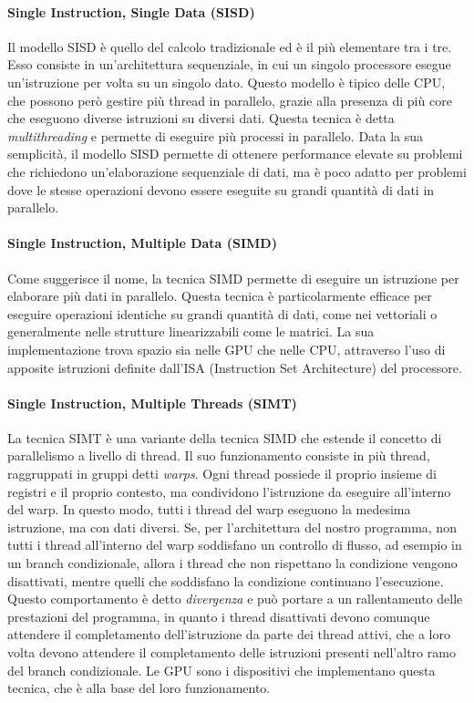 \paragraph{Single Instruction, Single Data (SISD)}
\label{para:simd}

Il modello SISD è quello del calcolo tradizionale ed è il più elementare tra i tre.
Esso consiste in un'architettura sequenziale, in cui un singolo processore esegue
un'istruzione per volta su un singolo dato. Questo modello è tipico delle CPU, che
possono però gestire più thread in parallelo, grazie alla presenza di più core
che eseguono diverse istruzioni su diversi dati. Questa tecnica è detta \textit{multithreading}
e permette di eseguire più processi in parallelo. Data la sua semplicità, il
modello SISD permette di ottenere performance elevate su problemi che richiedono
un'elaborazione sequenziale di dati, ma è poco adatto per problemi dove le stesse
operazioni devono essere eseguite su grandi quantità di dati in parallelo.

\paragraph{Single Instruction, Multiple Data (SIMD)}
\label{para:simd}

Come suggerisce il nome, la tecnica SIMD permette di eseguire un istruzione per
elaborare più dati in parallelo. Questa tecnica è particolarmente efficace per eseguire
operazioni identiche su grandi quantità di dati, come nei vettoriali o
generalmente nelle strutture linearizzabili come le matrici. La sua implementazione
trova spazio sia nelle GPU che nelle CPU, attraverso l'uso di apposite
istruzioni definite dall'ISA (Instruction Set Architecture) del processore.

\paragraph{Single Instruction, Multiple Threads (SIMT)\cite{generalpurposegpu}}
\label{para:simt}

La tecnica SIMT è una variante della tecnica SIMD che estende il concetto di
parallelismo a livello di thread. Il suo funzionamento consiste in più thread,
raggruppati in gruppi detti \textit{warps}. Ogni thread possiede il proprio
insieme di registri e il proprio contesto, ma condividono l'istruzione da eseguire
all'interno del warp. In questo modo, tutti i thread del warp eseguono la medesima
istruzione, ma con dati diversi. Se, per l'architettura del nostro programma, non
tutti i thread all'interno del warp soddisfano un controllo di flusso, ad
esempio in un branch condizionale, allora i thread che non rispettano la condizione
vengono disattivati, mentre quelli che soddisfano la condizione continuano l'esecuzione.
Questo comportamento è detto \textit{divergenza} e può portare a un
rallentamento delle prestazioni del programma, in quanto i thread disattivati devono
comunque attendere il completamento dell'istruzione da parte dei thread attivi,
che a loro volta devono attendere il completamento delle istruzioni presenti
nell'altro ramo del branch condizionale. Le GPU sono i dispositivi che implementano
questa tecnica, che è alla base del loro funzionamento.

